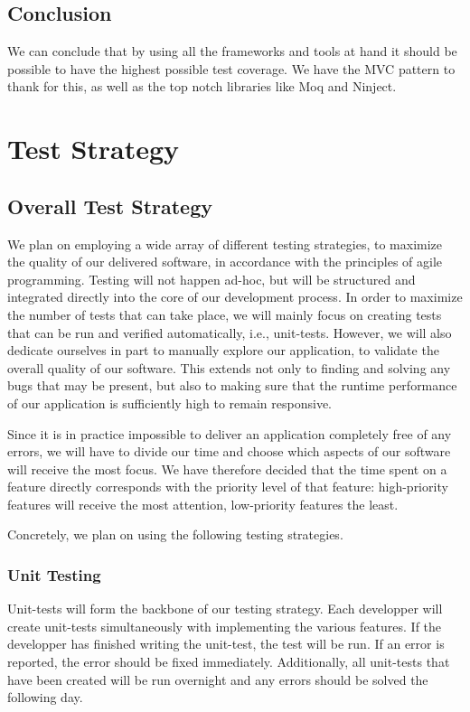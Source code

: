 \documentclass[10pt,a4paper,BCOR12mm, headexclude, footexclude,
  twoside, openright]{scrartcl}
\numberwithin{equation}{section} %
\numberwithin{figure}{section} %
\numberwithin{table}{section} %
\begin{document}
\subsection{Conclusion}
We can conclude that by using all the frameworks and tools at hand it should be
possible to have the highest possible test coverage. We have the MVC pattern to
thank for this, as well as the top notch libraries like Moq and Ninject.


\section{Test Strategy}

\subsection{Overall Test Strategy}
We plan on employing a wide array of different testing strategies, to maximize
the quality of our delivered software, in accordance with the principles of
agile programming. Testing will not happen ad-hoc, but will be structured and
integrated directly into the core of our development process.  In order to
maximize the number of tests that can take place, we will mainly focus on
creating tests that can be run and verified automatically, i.e., unit-tests.
However, we will also dedicate ourselves in part to manually explore our
application, to validate the overall quality of our software. This extends not
only to finding and solving any bugs that may be present, but also to making
sure that the runtime performance of our application is sufficiently high to
remain responsive.

Since it is in practice impossible to deliver an application completely free of
any errors, we will have to divide our time and choose which aspects of our
software will receive the most focus. We have therefore decided that the time
spent on a feature directly corresponds with the priority level of that feature:
high-priority features will receive the most attention, low-priority features
the least.

Concretely, we plan on using the following testing strategies.

\subsubsection*{Unit Testing}
Unit-tests will form the backbone of our testing strategy. Each developper will
create unit-tests simultaneously with implementing the various features.  If the
developper has finished writing the unit-test, the test will be run. If an error
is reported, the error should be fixed immediately.  Additionally, all
unit-tests that have been created will be run overnight and any errors should be
solved the following day.
\end{document}
